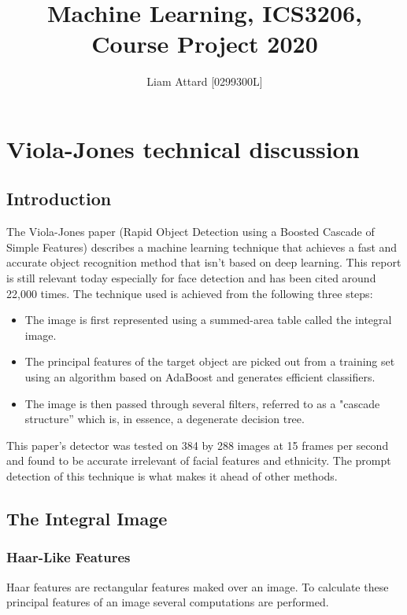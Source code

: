 \documentclass[12pt, letterpaper]{article}
\title{Machine Learning, ICS3206, Course Project 2020}
\author{Liam Attard [0299300L]}
\date{}
\begin{document}
    \maketitle

    \section{Viola-Jones technical discussion}
        \subsection{Introduction}
            The Viola-Jones paper (Rapid Object Detection using a
            Boosted Cascade of Simple Features) describes a machine
            learning technique that achieves a fast and accurate
            object recognition method that isn’t based on deep learning.
            This report is still relevant today especially for face
            detection and has been cited around 22,000 times. The
            technique used is achieved from the following three steps:
            \begin{itemize}
                \item The image is first represented using a summed-area table
                called the integral image.
                \item The principal features of the target object are picked
                out from a training set using an algorithm based on AdaBoost
                and generates efficient classifiers.
                \item The image is then passed through several filters, 
                referred to as a "cascade structure” which is, in essence, a
                degenerate decision tree. 

            \end{itemize}
            This paper’s detector was tested on 384 by 288 images at 15 frames
            per second and found to be accurate irrelevant of facial features 
            and ethnicity. The prompt detection of this technique is what
            makes it ahead of other methods.

        \subsection{The Integral Image}
            \subsubsection{Haar-Like Features}
                Haar features are rectangular features maked over an image.
                To calculate these principal features of an image several 
                computations are performed. 
\end{document}
